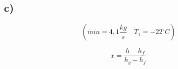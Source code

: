 

\subsection*{c)}

\[
(\dot{m} in = 4,1 \frac{kg}{s} \quad \dot{T}_1 = -22^\circ C)
\]

\[
x = \frac{h - h_f}{h_g - h_f}
\]